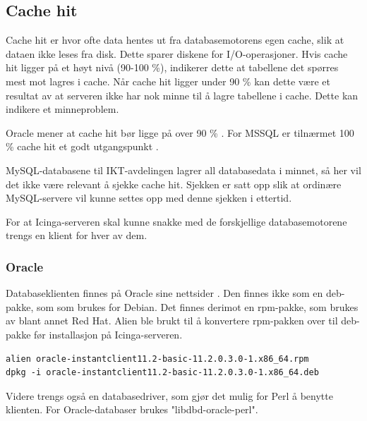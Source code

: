 \subsection*{Cache hit}
Cache hit er hvor ofte data hentes ut fra databasemotorens egen cache, slik at dataen ikke leses fra disk. Dette sparer diskene for I/O-operasjoner. Hvis cache hit ligger på et høyt nivå (90-100 \%), indikerer dette at tabellene det spørres mest mot lagres i cache. Når cache hit ligger under 90 \% kan dette være et resultat av at serveren ikke har nok minne til å lagre tabellene i cache. Dette kan indikere et minneproblem.

Oracle mener at cache hit bør ligge på over 90 \% \cite{oraclecachehit}. For MSSQL er tilnærmet 100 \% cache hit et godt utgangspunkt \cite{sqlmonitoring}.

MySQL-databasene til IKT-avdelingen lagrer all databasedata i minnet, så her vil det ikke være relevant å sjekke cache hit. Sjekken er satt opp slik at ordinære MySQL-servere vil kunne settes opp med denne sjekken i ettertid.

For at Icinga-serveren skal kunne snakke med de forskjellige databasemotorene trengs en klient for hver av dem. 

\subsubsection{Oracle}
Databaseklienten finnes på Oracle sine nettsider \cite{oracleclient}. Den finnes ikke som en deb-pakke, som som brukes for Debian. Det finnes derimot en rpm-pakke, som brukes av blant annet Red Hat. Alien \cite{debian:alien} ble brukt til å konvertere rpm-pakken over til deb-pakke før installasjon på Icinga-serveren. 
\begin{lstlisting}
alien oracle-instantclient11.2-basic-11.2.0.3.0-1.x86_64.rpm 
dpkg -i oracle-instantclient11.2-basic-11.2.0.3.0-1.x86_64.deb
\end{lstlisting}
Videre trengs også en databasedriver, som gjør det mulig for Perl å benytte klienten. For Oracle-databaser brukes "libdbd-oracle-perl".


